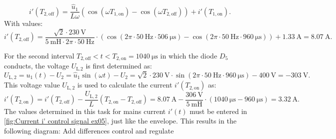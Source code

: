 \begin{solutionblock}
     \begin{equation}
        i'(T_\mathrm{2,off}) = \frac{\hat u_\mathrm{1}}{L \omega}(\cos (\omega T_\mathrm{1,on})- \cos(\omega T_\mathrm{2,off}))+ i'(T_\mathrm{1,on}).
    \end{equation}
    With values:
    \begin{equation}
        i'(T_\mathrm{2,off}) = \frac{\sqrt{2}\cdot\SI{230}{\volt}}{\SI{5}{\milli\henry}\cdot 2\pi \cdot \SI{50}{\hertz}}\cdot (\cos(2\pi \cdot \SI{50}{\hertz}\cdot \SI{506}{\micro\s})-\cos(2\pi \cdot \SI{50}{\hertz} \cdot \SI{960}{\micro\s})) + \SI{1.33}{\ampere}= \SI{8.07}{\ampere}.
     \end{equation}

     For the second interval $T_\mathrm{2,off} < t < T_\mathrm{2,on} = \SI{1040}{\micro\s}$ in which the diode $D_\mathrm{5}$ conducts, the voltage $U_\mathrm{L.2}$ is first determined as:
     \begin{equation}
        U_\mathrm{L,2} = u_\mathrm{1}(t) - U_\mathrm{2}= \hat u_\mathrm{1} \sin(\omega t) - U_\mathrm{2} = \sqrt{2} \cdot \SI{230}{\volt} \cdot \sin(2\pi \cdot \SI{50}{\hertz}\cdot \SI{960}{\micro\s}) - \SI{400}{\volt} = -\SI{303}{\volt}.
    \end{equation}
    This voltage value  $U_\mathrm{L,2}$ is used to calculate the current  $i'(T_\mathrm{2,on})$ as:
    \begin{equation}
        i'(T_\mathrm{2,on}) = i'(T_\mathrm{2,off}) -\frac{ U_\mathrm{L,2}}{L}(T_\mathrm{2,on}-T_\mathrm{2,off}) = \SI{8.07}{\ampere} -\frac{\SI{306}{\volt}}{\SI{5}{\milli\henry}}\cdot (\SI{1040}{\micro\s}-\SI{960}{\micro\s}) = \SI{3.32}{\ampere}.
    \end{equation}
    The values determined in this task for mains current
    $i'(t)$ must be entered in \autoref{fig:Current i' control signal ex05}, just like the envelope. This results in the following diagram:
    Add differences control and regulate
\end{solutionblock}





